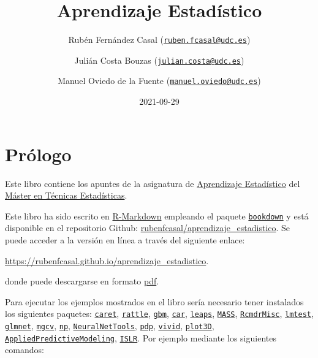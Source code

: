 \documentclass[
  spanish,
]{book}
\title{Aprendizaje Estadístico}
\author{Rubén Fernández Casal (\href{mailto:ruben.fcasal@udc.es}{\nolinkurl{ruben.fcasal@udc.es}}) \and Julián Costa Bouzas (\href{mailto:julian.costa@udc.es}{\nolinkurl{julian.costa@udc.es}}) \and Manuel Oviedo de la Fuente (\href{mailto:manuel.oviedo@udc.es}{\nolinkurl{manuel.oviedo@udc.es}})}
\date{2021-09-29}
\theoremstyle{break}
\theoremstyle{definition}
\theoremstyle{definition}
\theoremstyle{definition}
\theoremstyle{definition}
\theoremstyle{remark}
\begin{document}
\maketitle

{
\setcounter{tocdepth}{1}
\tableofcontents
}
\hypertarget{pruxf3logo}{%
\chapter*{Prólogo}\label{pruxf3logo}}

Este libro contiene los apuntes de la asignatura de \href{http://eamo.usc.es/pub/mte/index.php?option=com_content\&view=article\&id=74}{Aprendizaje Estadístico} del \href{http://eio.usc.es/pub/mte}{Máster en Técnicas Estadísticas}.

Este libro ha sido escrito en \href{http://rmarkdown.rstudio.com}{R-Markdown} empleando el paquete \href{https://bookdown.org/yihui/bookdown/}{\texttt{bookdown}} y está disponible en el repositorio Github: \href{https://github.com/rubenfcasal/aprendizaje_estadistico}{rubenfcasal/aprendizaje\_estadistico}.
Se puede acceder a la versión en línea a través del siguiente enlace:

\url{https://rubenfcasal.github.io/aprendizaje_estadistico}.

donde puede descargarse en formato \href{https://rubenfcasal.github.io/aprendizaje_estadistico/aprendizaje_estadistico.pdf}{pdf}.

Para ejecutar los ejemplos mostrados en el libro sería necesario tener instalados los siguientes paquetes:
\href{https://CRAN.R-project.org/package=caret}{\texttt{caret}}, \href{https://CRAN.R-project.org/package=rattle}{\texttt{rattle}}, \href{https://CRAN.R-project.org/package=gbm}{\texttt{gbm}}, \href{https://CRAN.R-project.org/package=car}{\texttt{car}}, \href{https://CRAN.R-project.org/package=leaps}{\texttt{leaps}}, \href{https://CRAN.R-project.org/package=MASS}{\texttt{MASS}}, \href{https://CRAN.R-project.org/package=RcmdrMisc}{\texttt{RcmdrMisc}}, \href{https://CRAN.R-project.org/package=lmtest}{\texttt{lmtest}}, \href{https://CRAN.R-project.org/package=glmnet}{\texttt{glmnet}}, \href{https://CRAN.R-project.org/package=mgcv}{\texttt{mgcv}}, \href{https://CRAN.R-project.org/package=np}{\texttt{np}}, \href{https://CRAN.R-project.org/package=NeuralNetTools}{\texttt{NeuralNetTools}}, \href{https://CRAN.R-project.org/package=pdp}{\texttt{pdp}}, \href{https://CRAN.R-project.org/package=vivid}{\texttt{vivid}}, \href{https://CRAN.R-project.org/package=plot3D}{\texttt{plot3D}}, \href{https://CRAN.R-project.org/package=AppliedPredictiveModeling}{\texttt{AppliedPredictiveModeling}}, \href{https://CRAN.R-project.org/package=ISLR}{\texttt{ISLR}}.
Por ejemplo mediante los siguientes comandos:
\end{document}
